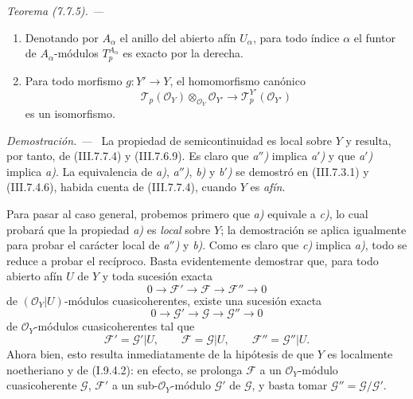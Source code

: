 \documentclass[10pt,oneside]{book}
\newcommand{\sref}[2][]{\textup{(#2)}}
\newenvironment{theorem}[1][]{\par\medskip\noindent\itshape Teorema (#1). ---\ }{\par}
\newenvironment{proof}{\par\medskip\noindent\textit{Demostración. ---\ }}{\par}
\begin{document}
\begin{theorem}[7.7.5]
\begin{enumerate}
  \item[\textup{c)}] Denotando por $A_\alpha$ el anillo del abierto afín $U_\alpha$,
    para todo índice $\alpha$ el funtor de $A_\alpha$-módulos
    $T_p^{A_\alpha}$ es exacto por la derecha.

  \item[\textup{d)}] Para todo morfismo $g:Y'\to Y$, el homomorfismo canónico
    \[
      \mathscr T_p(\mathscr O_Y)
      \otimes_{\mathscr O_Y}\mathscr O_{Y'}
      \longrightarrow
      \mathscr T_p^{Y'}(\mathscr O_{Y'})
      \tag{7.7.5.3}\label{III.7.7.5.3}
    \]
    es un isomorfismo.
\end{enumerate}
\end{theorem}

\begin{proof}
La propiedad de semicontinuidad es local sobre $Y$ y resulta, por tanto, de
\sref{III.7.7.4} y \sref{III.7.6.9}. Es claro que \emph{a$''$)} implica \emph{a$'$)} y que
\emph{a$'$)} implica \emph{a)}. La equivalencia de \emph{a)}, \emph{a$''$)}, \emph{b)} y \emph{b$'$)} se demostró en
\sref{III.7.3.1} y \sref{III.7.4.6}, habida cuenta de
\sref{III.7.7.4}, cuando $Y$ es \emph{afín}.

Para pasar al caso general, probemos primero que \emph{a)} equivale a \emph{c)}, lo cual
probará que la propiedad \emph{a)} es \emph{local} sobre $Y$; la demostración se aplica
igualmente para probar el carácter local de \emph{a$''$)} y \emph{b)}. Como es claro que \emph{c)}
implica \emph{a)}, todo se reduce a probar el recíproco. Basta evidentemente demostrar
que, para todo abierto afín $U$ de $Y$ y toda sucesión exacta
\[
  0\longrightarrow\mathscr F'
  \longrightarrow\mathscr F
  \longrightarrow\mathscr F''
  \longrightarrow0
\]
de $(\mathscr O_Y|U)$-módulos cuasicoherentes, existe una sucesión exacta
\[
  0\longrightarrow\mathscr G'
  \longrightarrow\mathscr G
  \longrightarrow\mathscr G''
  \longrightarrow0
\]
de $\mathscr O_Y$-módulos cuasicoherentes tal que
\[
  \mathscr F'=\mathscr G'|U,
  \qquad
  \mathscr F=\mathscr G|U,
  \qquad
  \mathscr F''=\mathscr G''|U.
\]
Ahora bien, esto resulta inmediatamente de la hipótesis de que $Y$ es
localmente noetheriano y de \sref[I]{I.9.4.2}: en efecto, se prolonga
$\mathscr F$ a un $\mathscr O_Y$-módulo cuasicoherente $\mathscr G$,
$\mathscr F'$ a un sub-$\mathscr O_Y$-módulo $\mathscr G'$ de $\mathscr G$, y
basta tomar $\mathscr G''=\mathscr G/\mathscr G'$.


\end{proof}
\end{document}
